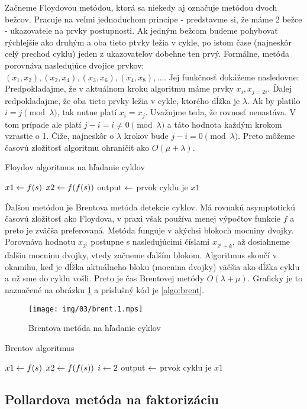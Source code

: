 Začneme Floydovou metódou, ktorá sa niekedy aj označuje metódou dvoch
bežcov. Pracuje na veľmi jednoduchom princípe - predstavme si, že máme
2 bežce - ukazovatele na prvky postupnosti. Ak jedným bežcom budeme
pohybovať rýchlejšie ako druhým a oba tieto ptvky ležia v cykle, po
istom čase (najneskôr celý prechod cyklu) jeden z ukazovateľov dobehne
ten prvý. Formálne, metóda porovnáva nasledujúce dvojice prvkov:
$(x_1,x_2), (x_2,x_4), (x_3,x_6), (x_4,x_8), \dots$.
Jej funkčnosť dokážeme nasledovne: Predpokladajme, že v aktuálnom
kroku algoritmu máme prvky $x_i, x_{j=2i}$. Ďalej redpokladajme,
že oba tieto prvky ležia v cykle, ktorého dĺžka je $\lambda$.
Ak by platilo $i = j \pmod{\lambda}$, tak nutne platí $x_i = x_j$.
Uvažujme teda, že rovnosť nenastáva. V tom prípade ale platí $j-i = i \ne
0 \pmod{\lambda}$ a táto hodnota každým krokom vzrastie o 1. Čiže,
najneskôr o $\lambda$ krokov bude $j-i = 0 \pmod{\lambda}$.
Preto môžeme časovú zložitosť algoritmu ohraničiť ako $O(\mu+\lambda)$.

\begin{algorithm}
    \label{algo:floyd}
    \caption{Floydov algoritmus na hľadanie cyklov}
    $x1 \leftarrow f(s)$\;
    $x2 \leftarrow f(f(s))$\;
    output $\leftarrow$ prvok cyklu je $x1$\;
\end{algorithm}

Ďalšou metódou je Brentova metóda detekcie cyklov. Má rovnakú
asymptotickú časovú zložitosť ako Floydova, v praxi však používa menej
výpočtov funkcie $f$ a preto je zväčša preferovaná.
Metóda funguje v akýchsi blokoch mocniny dvojky.
Porovnáva hodnotu $x_{2^i}$ postupne s nasledujúcimi číslami
$x_{2^i+k}$, až dosiahneme ďalšiu mocninu dvojky, vtedy začneme ďalším
blokom. Algoritmus skončí v okamihu, keď je dĺžka aktuálneho bloku
(mocnina dvojky) väčšia ako dĺžka cyklu a už sme do cyklu vošli.
Preto je čas Brentovej metódy $O(\lambda + \mu)$.
Graficky je to naznačené na obrázku \ref{fig:brent} a príslušný kód je
\ref{algo:brent}.

\begin{figure}[h!]
    \label{fig:brent}
    \caption{Brentova metóda na hľadanie cyklov}
    \centering
    \texttt{[image: img/03/brent.1.mps]}
\end{figure}

\begin{algorithm}
    \label{algo:floyd}
    \caption{Brentov algoritmus}
    $x1 \leftarrow f(s)$\;
    $x2 \leftarrow f(f(s))$\;
    $i \leftarrow 2$\;
    output $\leftarrow$ prvok cyklu je $x1$\;
\end{algorithm}

\subsection{Pollardova metóda na faktorizáciu}
